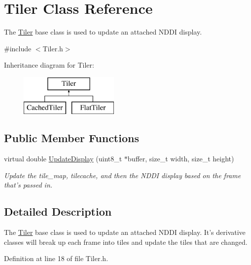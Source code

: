 \hypertarget{class_tiler}{
\section{Tiler Class Reference}
\label{class_tiler}
}


The \hyperlink{class_tiler}{Tiler} base class is used to update an attached NDDI display.  




{\ttfamily \#include $<$Tiler.h$>$}

Inheritance diagram for Tiler:\begin{figure}[H]
\begin{center}
\leavevmode
\includegraphics[height=2.000000cm]{class_tiler}
\end{center}
\end{figure}
\subsection*{Public Member Functions}
\begin{DoxyCompactItemize}
\item 
virtual double \hyperlink{class_tiler_a1eba24ca0a905dbdad566d99b753fc39}{UpdateDisplay} (uint8\_\-t $\ast$buffer, size\_\-t width, size\_\-t height)
\begin{DoxyCompactList}\small\item\em Update the tile\_\-map, tilecache, and then the NDDI display based on the frame that's passed in. \item\end{DoxyCompactList}\end{DoxyCompactItemize}


\subsection{Detailed Description}
The \hyperlink{class_tiler}{Tiler} base class is used to update an attached NDDI display. It's derivative classes will break up each frame into tiles and update the tiles that are changed. 

Definition at line 18 of file Tiler.h.



